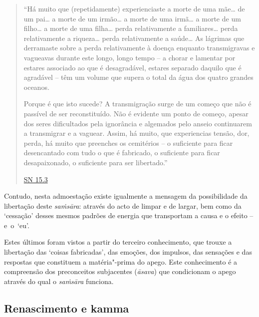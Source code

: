 \begin{quote}

  ``Há muito que (repetidamente) experienciaste a morte de uma mãe\ldots{} de um
  pai\ldots{} a morte de um irmão\ldots{} a morte de uma irmã\ldots{} a morte de
  um filho\ldots{} a morte de uma filha\ldots{} perda relativamente a
  familiares\ldots{} perda relativamente a riqueza\ldots{} perda relativamente a
  saúde\ldots{} As lágrimas que derramaste sobre a perda relativamente à doença
  enquanto transmigravas e vagueavas durante este longo, longo tempo -- a chorar
  e lamentar por estares associado ao que é desagradável, estares separado
  daquilo que é agradável -- têm um volume que supera o total da água dos quatro
  grandes oceanos.

  Porque é que isto sucede? A transmigração surge de um começo que não é
  passível de ser reconstituído. Não é evidente um ponto de começo, apesar dos
  seres dificultados pela ignorância e algemados pelo anseio continuarem a
  transmigrar e a vaguear. Assim, há muito, que experiencias tensão, dor, perda,
  há muito que preenches os cemitérios -- o suficiente para ficar desencantado
  com tudo o que é fabricado, o suficiente para ficar desapaixonado, o
  suficiente para ser libertado.''

  \href{https://suttacentral.net/sn15.3/en/thanissaro}{SN 15.3}

\end{quote}

Contudo, nesta admoestação existe igualmente a mensagem da possibilidade da
libertação deste \emph{saṁsāra}: através do acto de limpar e de largar, bem como
da `cessação' desses mesmos padrões de energia que transportam a causa e o
efeito -- e~o~`eu'.

Estes últimos foram vistos a partir do terceiro conhecimento, que trouxe a
libertação das `coisas fabricadas', das emoções, dos impulsos, das sensações e
das respostas que constituem a matéria"-prima do apego. Este conhecimento é a
compreensão dos preconceitos subjacentes (\emph{āsava}) que condicionam o apego
através do qual o \emph{saṁsāra} funciona.

\subsection{Renascimento e kamma}

